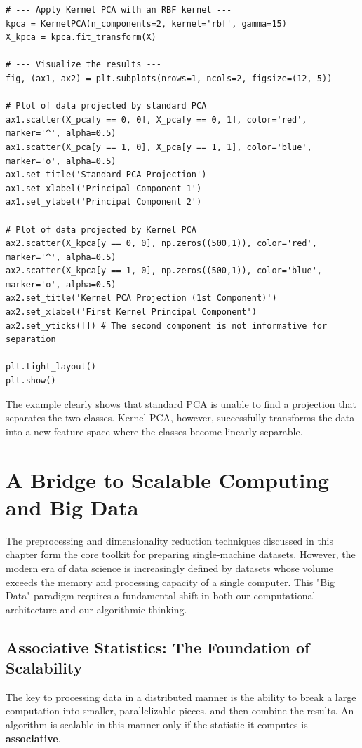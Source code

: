 \begin{enumerate}
\begin{example}
\begin{verbatim}
# --- Apply Kernel PCA with an RBF kernel ---
kpca = KernelPCA(n_components=2, kernel='rbf', gamma=15)
X_kpca = kpca.fit_transform(X)

# --- Visualize the results ---
fig, (ax1, ax2) = plt.subplots(nrows=1, ncols=2, figsize=(12, 5))

# Plot of data projected by standard PCA
ax1.scatter(X_pca[y == 0, 0], X_pca[y == 0, 1], color='red', marker='^', alpha=0.5)
ax1.scatter(X_pca[y == 1, 0], X_pca[y == 1, 1], color='blue', marker='o', alpha=0.5)
ax1.set_title('Standard PCA Projection')
ax1.set_xlabel('Principal Component 1')
ax1.set_ylabel('Principal Component 2')

# Plot of data projected by Kernel PCA
ax2.scatter(X_kpca[y == 0, 0], np.zeros((500,1)), color='red', marker='^', alpha=0.5)
ax2.scatter(X_kpca[y == 1, 0], np.zeros((500,1)), color='blue', marker='o', alpha=0.5)
ax2.set_title('Kernel PCA Projection (1st Component)')
ax2.set_xlabel('First Kernel Principal Component')
ax2.set_yticks([]) # The second component is not informative for separation

plt.tight_layout()
plt.show()
\end{verbatim}
The example clearly shows that standard PCA is unable to find a projection that separates the two classes. Kernel PCA, however, successfully transforms the data into a new feature space where the classes become linearly separable.
\end{example}

\section{A Bridge to Scalable Computing and Big Data}
\label{sec:scalable_computing_bridge}

The preprocessing and dimensionality reduction techniques discussed in this chapter form the core toolkit for preparing single-machine datasets. However, the modern era of data science is increasingly defined by datasets whose volume exceeds the memory and processing capacity of a single computer. This "Big Data" paradigm requires a fundamental shift in both our computational architecture and our algorithmic thinking.

\subsection{Associative Statistics: The Foundation of Scalability}
The key to processing data in a distributed manner is the ability to break a large computation into smaller, parallelizable pieces, and then combine the results. An algorithm is scalable in this manner only if the statistic it computes is \textbf{associative}.


\end{enumerate}
